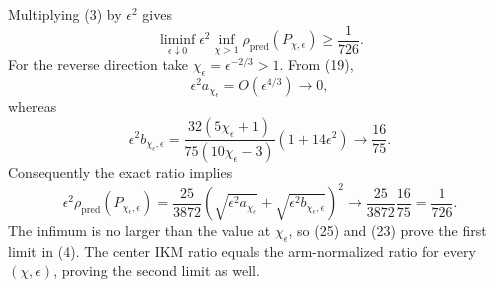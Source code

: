 Multiplying (3) by \(\epsilon^2\) gives
\[
 \liminf_{\epsilon\downarrow0}\epsilon^2
 \inf_{\chi>1}\rho_{\mathrm{pred}}(P_{\chi,\epsilon})
 \ge\frac1{726}.                                      \tag{23}
\]
For the reverse direction take \(\chi_\epsilon=\epsilon^{-2/3}>1\). From (19),
\[
 \epsilon^2a_{\chi_\epsilon}=O(\epsilon^{4/3})\longrightarrow0,
\]
whereas
\[
 \epsilon^2b_{\chi_\epsilon,\epsilon}
 =\frac{32(5\chi_\epsilon+1)}{75(10\chi_\epsilon-3)}
 (1+14\epsilon^2)\longrightarrow\frac{16}{75}.         \tag{24}
\]
Consequently the exact ratio implies
\[
 \epsilon^2\rho_{\mathrm{pred}}(P_{\chi_\epsilon,\epsilon})
 =\frac{25}{3872}
 \left(\sqrt{\epsilon^2a_{\chi_\epsilon}}
 +\sqrt{\epsilon^2b_{\chi_\epsilon,\epsilon}}\right)^2
 \longrightarrow \frac{25}{3872}\frac{16}{75}
 =\frac1{726}.                                        \tag{25}
\]
The infimum is no larger than the value at \(\chi_\epsilon\), so (25) and (23) prove the first limit in (4). The center IKM ratio equals the arm-normalized ratio for every \((\chi,\epsilon)\), proving the second limit as well.